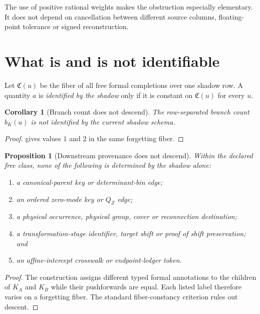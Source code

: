 \documentclass[11pt]{article}
\newtheorem{proposition}[theorem]{Proposition}
\newtheorem{corollary}[theorem]{Corollary}
\theoremstyle{definition}
\theoremstyle{remark}
\begin{document}
The use of positive rational weights makes the obstruction especially
elementary.  It does not depend on cancellation between different
source columns, floating-point tolerance or signed reconstruction.

\section{What is and is not identifiable}

Let \(\mathfrak C(u)\) be the fiber of all free formal completions over
one shadow row.  A quantity \(a\) is \emph{identified by the shadow}
only if it is constant on \(\mathfrak C(u)\) for every \(u\).

\begin{corollary}[Branch count does not descend]
\label{cor:branch}
The row-separated branch count \(b_K(u)\) is not identified by the
current shadow schema.
\end{corollary}

\begin{proof}
 gives values \(1\) and \(2\) in the same
forgetting fiber.
\end{proof}

\begin{proposition}[Downstream provenance does not descend]
\label{prop:labels}
Within the declared free class, none of the following is determined
by the shadow alone:
\begin{enumerate}[label=(\roman*),leftmargin=2.2em]
\item a canonical-parent key or determinant-bin edge;
\item an ordered zero-mode key or \(Q_Z\) edge;
\item a physical occurrence, physical group, cover or reconnection
destination;
\item a transformation-stage identifier, target shift or proof of
shift preservation; and
\item an affine-intercept crosswalk or endpoint-ledger token.
\end{enumerate}
\end{proposition}

\begin{proof}
The construction assigns different typed formal annotations to the
children of \(K_A\) and \(K_B\) while their pushforwards are equal.
Each listed label therefore varies on a forgetting fiber.  The
standard fiber-constancy criterion rules out descent.
\end{proof}
\end{document}
